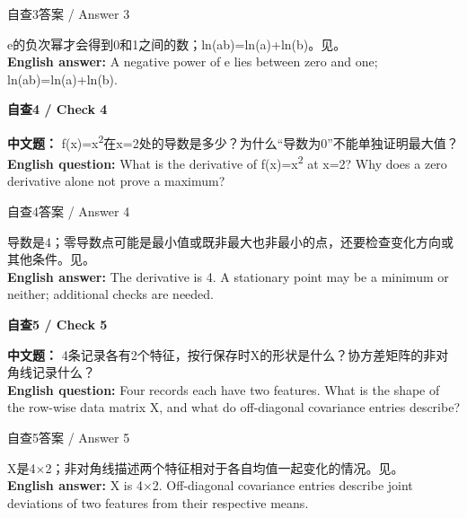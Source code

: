 \begin{StudySolution}{自查3答案 / Answer 3}


e的负次幂才会得到0和1之间的数；ln(ab)=ln(a)+ln(b)。见。\\

\textbf{English answer:} A negative power of e lies between zero and one; ln(ab)=ln(a)+ln(b).


\end{StudySolution}


\textbf{自查4 / Check 4}


\textbf{中文题：} f(x)=x\textsuperscript{2}在x=2处的导数是多少？为什么“导数为0”不能单独证明最大值？\\

\textbf{English question:} What is the derivative of f(x)=x\textsuperscript{2} at x=2? Why does a zero derivative alone not prove a maximum?



\begin{StudySolution}{自查4答案 / Answer 4}


导数是4；零导数点可能是最小值或既非最大也非最小的点，还要检查变化方向或其他条件。见。\\

\textbf{English answer:} The derivative is 4. A stationary point may be a minimum or neither; additional checks are needed.


\end{StudySolution}


\textbf{自查5 / Check 5}


\textbf{中文题：} 4条记录各有2个特征，按行保存时X的形状是什么？协方差矩阵的非对角线记录什么？\\

\textbf{English question:} Four records each have two features. What is the shape of the row-wise data matrix X, and what do off-diagonal covariance entries describe?



\begin{StudySolution}{自查5答案 / Answer 5}


X是4\ensuremath{\times}2；非对角线描述两个特征相对于各自均值一起变化的情况。见。\\

\textbf{English answer:} X is 4\ensuremath{\times}2. Off-diagonal covariance entries describe joint deviations of two features from their respective means.


\end{StudySolution}







